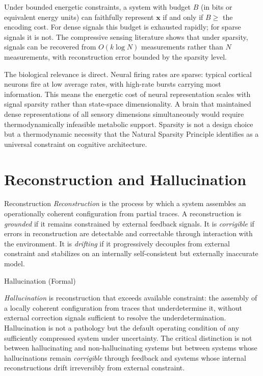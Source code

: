 Under bounded energetic constraints, a system with budget $B$ (in bits or equivalent
energy units) can faithfully represent $\mathbf{x}$ if and only if $B \geq$ the
encoding cost. For dense signals this budget is exhausted rapidly; for sparse signals
it is not. The compressive sensing literature shows that under sparsity, signals can
be recovered from $O(k \log N)$ measurements rather than $N$ measurements, with
reconstruction error bounded by the sparsity level.

The biological relevance is direct. Neural firing rates are sparse: typical cortical
neurons fire at low average rates, with high-rate bursts carrying most information.
This means the energetic cost of neural representation scales with signal sparsity
rather than state-space dimensionality. A brain that maintained dense representations
of all sensory dimensions simultaneously would require thermodynamically infeasible
metabolic support. Sparsity is not a design choice but a thermodynamic necessity
that the Natural Sparsity Principle identifies as a universal constraint on
cognitive architecture.

\section{Reconstruction and Hallucination}

\begin{definition}{Reconstruction}
\emph{Reconstruction} is the process by which a system assembles an operationally
coherent configuration from partial traces. A reconstruction is \emph{grounded} if
it remains constrained by external feedback signals. It is \emph{corrigible} if
errors in reconstruction are detectable and correctable through interaction with the
environment. It is \emph{drifting} if it progressively decouples from external
constraint and stabilizes on an internally self-consistent but externally inaccurate
model.
\end{definition}

\begin{definition}{Hallucination (Formal)}
\label{def:hallucination}

\emph{Hallucination} is reconstruction that exceeds available constraint: the
assembly of a locally coherent configuration from traces that underdetermine it,
without external correction signals sufficient to resolve the underdetermination.
Hallucination is not a pathology but the default operating condition of any
sufficiently compressed system under uncertainty. The critical distinction is not
between hallucinating and non-hallucinating systems but between systems whose
hallucinations remain \emph{corrigible} through feedback and systems whose internal
reconstructions drift irreversibly from external constraint.
\end{definition}

